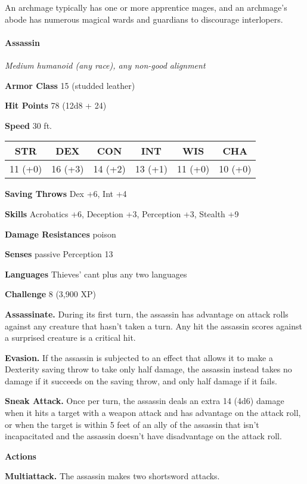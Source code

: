\documentclass[
]{article}
\begin{document}
An archmage typically has one or more apprentice mages, and an
archmage's abode has numerous magical wards and guardians to discourage
interlopers.

\hypertarget{assassin}{%
\paragraph{Assassin}\label{assassin}}

\emph{Medium humanoid (any race), any non-good alignment}

\textbf{Armor Class} 15 (studded leather)

\textbf{Hit Points} 78 (12d8 + 24)

\textbf{Speed} 30 ft.

\begin{longtable}[]{@{}cccccc@{}}
\toprule
STR & DEX & CON & INT & WIS & CHA\tabularnewline
\midrule
\endhead
11 (+0) & 16 (+3) & 14 (+2) & 13 (+1) & 11 (+0) & 10 (+0)\tabularnewline
\bottomrule
\end{longtable}

\textbf{Saving Throws} Dex +6, Int +4

\textbf{Skills} Acrobatics +6, Deception +3, Perception +3, Stealth +9

\textbf{Damage Resistances} poison

\textbf{Senses} passive Perception 13

\textbf{Languages} Thieves' cant plus any two languages

\textbf{Challenge} 8 (3,900 XP)

\textbf{Assassinate.} During its first turn, the assassin has advantage
on attack rolls against any creature that hasn't taken a turn. Any hit
the assassin scores against a surprised creature is a critical hit.

\textbf{Evasion.} If the assassin is subjected to an effect that allows
it to make a Dexterity saving throw to take only half damage, the
assassin instead takes no damage if it succeeds on the saving throw, and
only half damage if it fails.

\textbf{Sneak Attack.} Once per turn, the assassin deals an extra 14
(4d6) damage when it hits a target with a weapon attack and has
advantage on the attack roll, or when the target is within 5 feet of an
ally of the assassin that isn't incapacitated and the assassin doesn't
have disadvantage on the attack roll.

\textbf{Actions}

\textbf{Multiattack.} The assassin makes two shortsword attacks.
\end{document}

